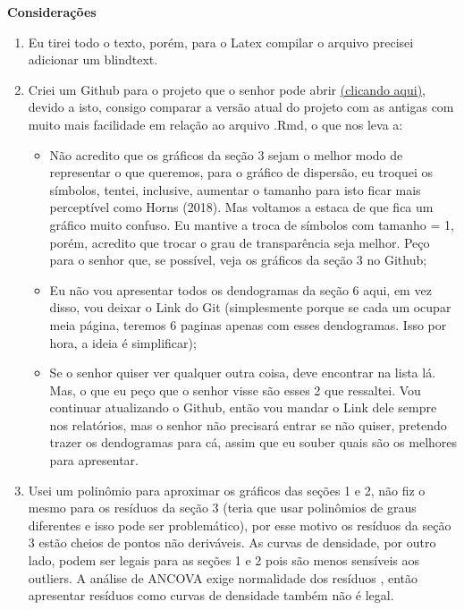 \textbf{Considerações}
\begin{enumerate}

\item Eu tirei todo o texto, porém, para o Latex compilar o arquivo precisei adicionar um blindtext.

\item Criei um Github para o projeto que o senhor pode abrir \href{https://github.com/bfaria1/ProjWAV/blob/master/README.md}{(clicando aqui)}, devido a isto, consigo comparar a versão atual do projeto com as antigas com muito mais facilidade em relação ao arquivo .Rmd, o que nos leva a:
\begin{itemize}
    \item Não acredito que os gráficos da seção 3 sejam o melhor modo de representar o que queremos, para o gráfico de dispersão, eu troquei os símbolos, tentei, inclusive, aumentar o tamanho para isto ficar mais perceptível como Horns (2018). Mas voltamos a estaca de que fica um gráfico muito confuso. Eu mantive a troca de símbolos com tamanho = 1, porém, acredito que trocar o grau de transparência seja melhor. Peço para o senhor que, se possível, veja os gráficos da seção 3 no Github;
    \item Eu não vou apresentar todos os dendogramas da seção 6 aqui, em vez disso, vou deixar o Link do Git (simplesmente porque se cada um ocupar meia página, teremos 6 paginas apenas com esses dendogramas. Isso por hora, a ideia é simplificar);
    \item Se o senhor quiser ver qualquer outra coisa, deve encontrar na lista lá. Mas, o que eu peço que o senhor visse são esses 2 que ressaltei. Vou continuar atualizando o Github, então vou mandar o Link dele sempre nos relatórios, mas o senhor não precisará entrar se não quiser, pretendo trazer os dendogramas para cá, assim que eu souber quais são os melhores para apresentar.
\end{itemize}

\item Usei um polinômio para aproximar os gráficos das seções 1 e 2, não fiz o mesmo para os resíduos da seção 3 (teria que usar polinômios de graus diferentes e isso pode ser problemático), por esse motivo os resíduos da seção 3 estão cheios de pontos não deriváveis. As curvas de densidade, por outro lado, podem ser legais para as seções 1 e 2 pois são menos sensíveis aos outliers. A análise de ANCOVA exige normalidade dos resíduos  \cite{Field2012}, então apresentar resíduos como curvas de densidade também não é legal.


\end{enumerate}

\color{white}

\cite{Horns2018}

\color{black}

\newpage

